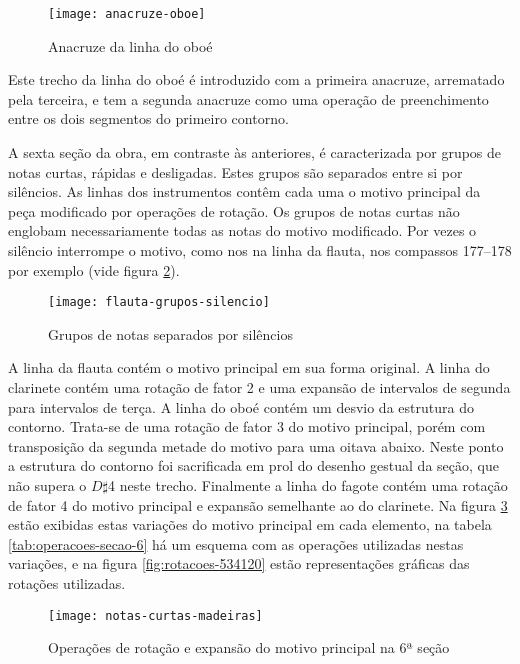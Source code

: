 \begin{figure}
  \centering
  \texttt{[image: anacruze-oboe]}
  \caption{Anacruze da linha do oboé}
  \label{fig:anacruze-oboe}
\end{figure}

Este trecho da linha do oboé é introduzido com a primeira anacruze,
arrematado pela terceira, e tem a segunda anacruze como uma operação
de preenchimento entre os dois segmentos do primeiro contorno.


A sexta seção da obra, em contraste às anteriores, é caracterizada por
grupos de notas curtas, rápidas e desligadas. Estes grupos são
separados entre si por silêncios. As linhas dos instrumentos contêm
cada uma o motivo principal da peça modificado por operações de
rotação. Os grupos de notas curtas não englobam necessariamente todas
as notas do motivo modificado. Por vezes o silêncio interrompe o
motivo, como nos na linha da flauta, nos compassos 177--178 por
exemplo (vide figura \ref{fig:grupos-separados-silencio}).

\begin{figure}
  \centering
  \texttt{[image: flauta-grupos-silencio]}
  \caption{Grupos de notas separados por silêncios}
  \label{fig:grupos-separados-silencio}
\end{figure}

A linha da flauta contém o motivo principal em sua forma original. A
linha do clarinete contém uma rotação de fator 2 e uma expansão de
intervalos de segunda para intervalos de terça. A linha do oboé contém
um desvio da estrutura do contorno. Trata-se de uma rotação de fator 3
do motivo principal, porém com transposição da segunda metade do
motivo para uma oitava abaixo. Neste ponto a estrutura do contorno foi
sacrificada em prol do desenho gestual da seção, que não supera o
$D\sharp$4 neste trecho. Finalmente a linha do fagote contém uma
rotação de fator 4 do motivo principal e expansão semelhante ao do
clarinete. Na figura \ref{fig:notas-curtas-madeiras} estão exibidas
estas variações do motivo principal em cada elemento, na tabela
\ref{tab:operacoes-secao-6} há um esquema com as operações utilizadas
nestas variações, e na figura \ref{fig:rotacoes-534120} estão
representações gráficas das rotações utilizadas.

\begin{figure}
  \centering
    \texttt{[image: notas-curtas-madeiras]}
    \caption{Operações de rotação e expansão do motivo principal na 6ª
    seção}
  \label{fig:notas-curtas-madeiras}
\end{figure}

